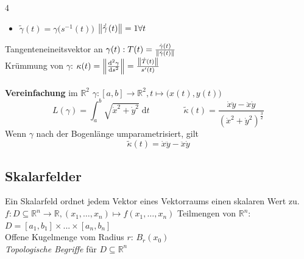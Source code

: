 \documentclass[6pt,a4paper]{scrartcl}
\newcommand{\norm}[2][\relax]{\ifx#1\relax \ensuremath{\left\Vert#2\right\Vert}\else \ensuremath{\left\Vert#2\right\Vert_{#1}}\fi}
\begin{document}
\begin{multicols*}{4}
\begin{itemize}
        \item $\tilde \gamma(t)=\gamma \bigl(s^{-1}(t) \bigr)$ \qquad $\norm{\ \dot{\tilde \!\! \gamma \!}\; (t)}=1 \forall t$ %
    \end{itemize}
    Tangenteneineitsvektor an $\gamma(t): T(t)=\frac{\dot \gamma(t)}{\norm{\dot \gamma(t)} }$\\
    Krümmung von $\gamma$: $\kappa(t)= \norm{\frac{\mathrm d^2 \gamma}{\mathrm d s^2}} = \frac{\norm{\dot T(t)}}{s'(t)}$\\
    \\
    \textbf{Vereinfachung} im $\mathbb{R}^2$ \qquad $\gamma:[a,b] \rightarrow \mathbb R^2, t \mapsto \bigl(x(t),y(t)\bigr)$ \\
    \begin{equation*}
        L(\gamma) = \int_a^b \sqrt{\dot x^2 + \dot y^2}\; \mathrm dt \qquad \qquad \tilde{\kappa}(t)=\frac{\dot x \ddot y - \ddot x \dot y}{(\dot x^2 + \dot y^2)^{\frac{3}{2}}}
    \end{equation*}
    Wenn $\gamma$ nach der Bogenlänge umparametrisiert, gilt
    \begin{equation*}
        \tilde{\kappa}(t)=\dot x \ddot y - \ddot x \dot y
    \end{equation*}



    \subsection{Skalarfelder}
    Ein Skalarfeld ordnet jedem Vektor eines Vektorraums einen skalaren Wert zu.\\
    $ f:D\subseteq \mathbb R^n \rightarrow \mathbb R, (x_1,\ldots ,x_n) \mapsto f(x_1,\ldots ,x_n) $
    Teilmengen von $\mathbb R^n$: $D = [a_1,b_1] \times ... \times [a_n,b_n]$\\
    Offene Kugelmenge vom Radius $r$: $B_r(x_0)$\\
    \emph{Topologische Begriffe} für $D \subseteq \mathbb R^n$


\end{multicols*}
\end{document}
